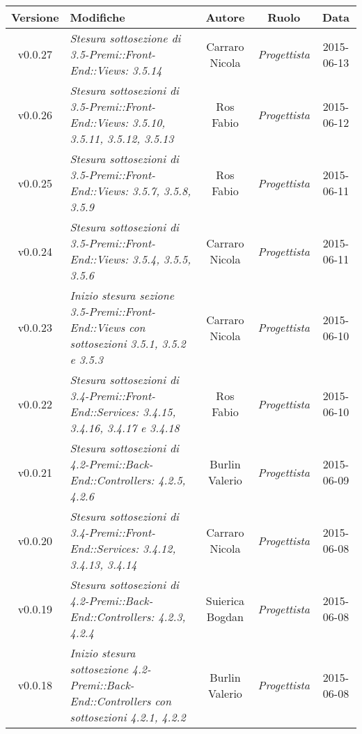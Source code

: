 \begin{table}[h]
\centering
\begin{tabular}{|c|p{}|c|c|c|}
	\toprule
		\textbf{Versione} & \textbf{Modifiche} & \textbf{Autore} & \textbf{Ruolo} & \textbf{Data}\\
	\midrule
	\midrule
		v0.0.27 & \textit{Stesura sottosezione di 3.5-Premi::Front-End::Views: 3.5.14} & Carraro Nicola & \textit{Progettista} & 2015-06-13\\
	\midrule
		v0.0.26 & \textit{Stesura sottosezioni di 3.5-Premi::Front-End::Views: 3.5.10, 3.5.11, 3.5.12, 3.5.13} & Ros Fabio & \textit{Progettista} & 2015-06-12\\
	\midrule
		v0.0.25 & \textit{Stesura sottosezioni di 3.5-Premi::Front-End::Views: 3.5.7, 3.5.8, 3.5.9} & Ros Fabio & \textit{Progettista} & 2015-06-11\\
	\midrule
		v0.0.24 & \textit{Stesura sottosezioni di 3.5-Premi::Front-End::Views: 3.5.4, 3.5.5, 3.5.6} & Carraro Nicola & \textit{Progettista} & 2015-06-11\\
	\midrule
		v0.0.23 & \textit{Inizio stesura sezione 3.5-Premi::Front-End::Views con sottosezioni 3.5.1, 3.5.2 e 3.5.3} & Carraro Nicola & \textit{Progettista} & 2015-06-10\\
	\midrule
		v0.0.22 & \textit{Stesura sottosezioni di 3.4-Premi::Front-End::Services: 3.4.15, 3.4.16, 3.4.17 e 3.4.18} & Ros Fabio & \textit{Progettista} & 2015-06-10\\
	\midrule
		v0.0.21 & \textit{Stesura sottosezioni di 4.2-Premi::Back-End::Controllers: 4.2.5, 4.2.6} & Burlin Valerio & \textit{Progettista} & 2015-06-09\\
	\midrule
		v0.0.20 & \textit{Stesura sottosezioni di 3.4-Premi::Front-End::Services: 3.4.12, 3.4.13, 3.4.14} & Carraro Nicola & \textit{Progettista} & 2015-06-08\\
	\midrule
		v0.0.19 & \textit{Stesura sottosezioni di 4.2-Premi::Back-End::Controllers: 4.2.3, 4.2.4} & Suierica Bogdan & \textit{Progettista} & 2015-06-08\\
	\midrule
		v0.0.18 & \textit{Inizio stesura sottosezione 4.2-Premi::Back-End::Controllers con sottosezioni 4.2.1, 4.2.2} & Burlin Valerio & \textit{Progettista} & 2015-06-08\\	
	\bottomrule
\end{tabular}
\end{table}

\newpage

